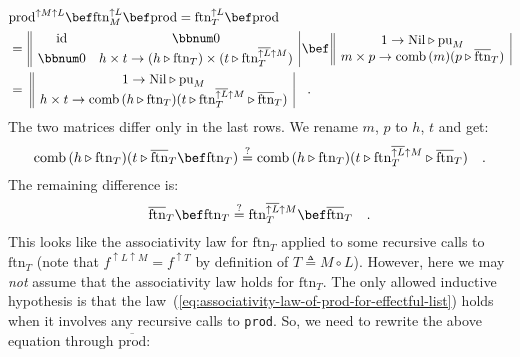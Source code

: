\begin{align*}
 & \text{prod}^{\uparrow M\uparrow L}\bef\text{ftn}_{M}^{\uparrow L}\bef\text{prod}=\text{ftn}_{T}^{\uparrow L}\bef\text{prod}\\
 & =\,\begin{array}{||cc|}
\text{id} & \bbnum 0\\
\bbnum 0 & h\times t\rightarrow(h\triangleright\text{ftn}_{T})\times(t\triangleright\text{ftn}_{T}^{\overline{\uparrow L}\uparrow M})
\end{array}\,\bef\,\begin{array}{||c|}
1\rightarrow\text{Nil}\triangleright\text{pu}_{M}\\
m\times p\rightarrow\text{comb}\,(m)(p\triangleright\overline{\text{ftn}}_{T})
\end{array}\\
 & =\,\,\begin{array}{||c|}
1\rightarrow\text{Nil}\triangleright\text{pu}_{M}\\
h\times t\rightarrow\text{comb}\,(h\triangleright\text{ftn}_{T})(t\triangleright\text{ftn}_{T}^{\overline{\uparrow L}\uparrow M}\triangleright\overline{\text{ftn}}_{T})
\end{array}\quad.
\end{align*}
The two matrices differ only in the last rows. We rename $m$, $p$
to $h$, $t$ and get:
\[
\text{comb}\,(h\triangleright\text{ftn}_{T})(t\triangleright\overline{\text{ftn}}_{T}\bef\text{ftn}_{T})\overset{?}{=}\text{comb}\,(h\triangleright\text{ftn}_{T})(t\triangleright\text{ftn}_{T}^{\overline{\uparrow L}\uparrow M}\triangleright\overline{\text{ftn}}_{T})\quad.
\]
The remaining difference is:
\[
\overline{\text{ftn}}_{T}\bef\text{ftn}_{T}\overset{?}{=}\text{ftn}_{T}^{\overline{\uparrow L}\uparrow M}\bef\overline{\text{ftn}}_{T}\quad.
\]
This looks like the associativity law for $\text{ftn}_{T}$ applied
to some recursive calls to $\text{ftn}_{T}$ (note that $f^{\uparrow L\uparrow M}=f^{\uparrow T}$
by definition of $T\triangleq M\circ L$). However, here we may \emph{not}
assume that the associativity law holds for $\text{ftn}_{T}$. The
only allowed inductive hypothesis is that the law~(\ref{eq:associativity-law-of-prod-for-effectful-list})
holds when it involves any recursive calls to \lstinline!prod!. So,
we need to rewrite the above equation through $\overline{\text{prod}}$:
